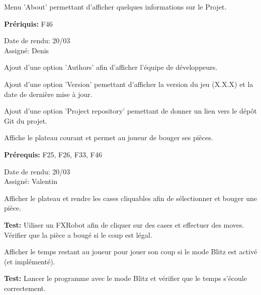 \documentclass{article}
\begin{document}
\begin{needbox}
    Menu 'About' permettant d'afficher quelques informations sur le Projet.

    \textbf{Prériquis:} F46
    \begin{duedatebox}
        Date de rendu: 20/03\\
        Assigné: Denis
    \end{duedatebox}
    \begin{subneedbox}[F49.1: Auteurs]
        Ajout d'une option 'Authors' afin d'afficher l'équipe de développeurs.
    \end{subneedbox}
    \begin{subneedbox}
        Ajout d'une option 'Version' pemettant d'afficher la version du jeu (X.X.X) et la date de dernière mise à jour.
    \end{subneedbox}
    \begin{subneedbox}
        Ajout d'une option 'Project repository' pemettant de donner un lien vers le dépôt Git du projet.
    \end{subneedbox}
\end{needbox}

\begin{needbox}
    Affiche le plateau courant et permet au joueur de bouger ses pièces.
    
    \textbf{Prérequis:} F25, F26, F33, F46
    \begin{duedatebox}
        Date de rendu: 20/03\\
        Assigné: Valentin
    \end{duedatebox}
    \begin{subneedbox}
        Afficher le plateau et rendre les cases cliquables afin de sélectionner et 
        bouger une pièce.

        \textbf{Test:} Uiliser un FXRobot afin de cliquer sur des cases et effectuer des moves.
        Vérifier que la pièce a bougé si le coup est légal.
    \end{subneedbox}
    \begin{subneedbox}
        Afficher le temps restant au joueur pour jouer son coup si le mode Blitz est activé (et implémenté).

        \textbf{Test:} Lancer le programme avec le mode Blitz et vérifier que le temps s'écoule correctement.
    \end{subneedbox}
\end{needbox}
\end{document}

